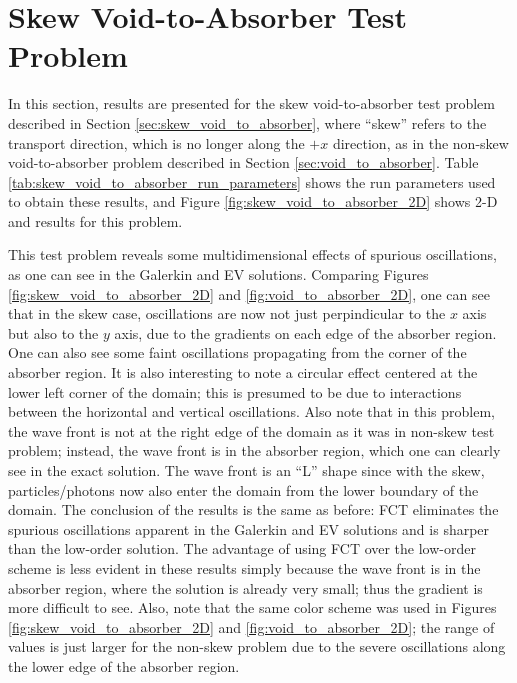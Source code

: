 \section{Skew Void-to-Absorber Test Problem}

In this section, results are presented for the skew void-to-absorber test
problem described in Section \ref{sec:skew_void_to_absorber}, where
``skew'' refers to the transport direction, which is no longer
along the $+x$ direction, as in the non-skew void-to-absorber problem
described in Section \ref{sec:void_to_absorber}.
Table \ref{tab:skew_void_to_absorber_run_parameters} shows the run parameters used
to obtain these results, and Figure \ref{fig:skew_void_to_absorber_2D}
shows 2-D and results for this problem.

This test problem reveals some multidimensional effects of spurious
oscillations, as one can see in the Galerkin and EV solutions. Comparing
Figures \ref{fig:skew_void_to_absorber_2D} and \ref{fig:void_to_absorber_2D},
one can see that in the skew case, oscillations are now not just perpindicular
to the $x$ axis but also to the $y$ axis, due to the gradients on each
edge of the absorber region. One can also see some faint oscillations
propagating from the corner of the absorber region. It is also interesting
to note a circular effect centered at the lower left corner of the domain;
this is presumed to be due to interactions between the horizontal and
vertical oscillations. Also note that in this problem, the wave front
is not at the right edge of the domain as it was in non-skew test
problem; instead, the wave front is in the absorber region, which
one can clearly see in the exact solution. The wave front is an ``L''
shape since with the skew, particles/photons now also enter the domain
from the lower boundary of the domain. The conclusion of the results
is the same as before: FCT eliminates the spurious oscillations apparent
in the Galerkin and EV solutions and is sharper than the low-order
solution. The advantage of using FCT over the low-order scheme is
less evident in these results simply because the wave front is
in the absorber region, where the solution is already very small;
thus the gradient is more difficult to see. Also, note that the same
color scheme was used in
Figures \ref{fig:skew_void_to_absorber_2D} and \ref{fig:void_to_absorber_2D};
the range of values is just larger for the non-skew problem due to the
severe oscillations along the lower edge of the absorber region.
